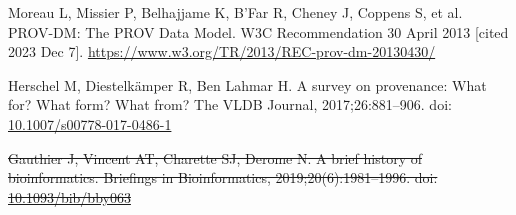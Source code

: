\documentclass[10pt,letterpaper]{article}
\providecommand{\DIFdeltex}[1]{{\protect\color{red}\sout{#1}}}                      %
\providecommand{\DIFdelbegin}{} %
\providecommand{\DIFdel}[1]{\texorpdfstring{\DIFdeltex{#1}}{}} %
\newcommand{\DIFscaledelfig}{0.5}
\newlength{\DIFdelgraphicswidth} %
\newlength{\DIFdelgraphicsheight} %
\newcommand{\DIFdelincludegraphics}[2][]{%
\sbox{\DIFdelgraphicsbox}{\DIFOincludegraphics[#1]{#2}}%
\settoboxwidth{\DIFdelgraphicswidth}{\DIFdelgraphicsbox} %
\settoboxtotalheight{\DIFdelgraphicsheight}{\DIFdelgraphicsbox} %
\scalebox{\DIFscaledelfig}{%
\parbox[b]{\DIFdelgraphicswidth}{\usebox{\DIFdelgraphicsbox}\\[-\baselineskip] \rule{\DIFdelgraphicswidth}{0em}}\llap{\resizebox{\DIFdelgraphicswidth}{\DIFdelgraphicsheight}{%
\setlength{\unitlength}{\DIFdelgraphicswidth}%
\begin{picture}(1,1)%
\thicklines\linethickness{2pt} %
{\color[rgb]{1,0,0}\put(0,0){\framebox(1,1){}}}%
{\color[rgb]{1,0,0}\put(0,0){\line( 1,1){1}}}%
{\color[rgb]{1,0,0}\put(0,1){\line(1,-1){1}}}%
\end{picture}%
}\hspace*{3pt}}} %
} %
\DeclareRobustCommand{\DIFdelbegin}{\DIFOdelbegin \let\includegraphics\DIFdelincludegraphics} %
\begin{document}
%
%
% 
\begin{thebibliography}{10}

\setlength{\parskip}{6pt}
\setlength{\itemsep}{0pt plus 0.3ex}


\begin{small}










Moreau L, Missier P, Belhajjame K, B'Far R, Cheney J, Coppens S, et al.
PROV-DM: The PROV Data Model. W3C Recommendation 30 April 2013 [cited 2023 Dec 7].
\url{https://www.w3.org/TR/2013/REC-prov-dm-20130430/}

Herschel M, Diestelkämper R, Ben Lahmar H.
A survey on provenance: What for? What form? What from?
The VLDB Journal, 2017;26:881--906.
doi: \href{https://doi.org/10.1007/s00778-017-0486-1}{10.1007/s00778-017-0486-1}

\DIFdelbegin {}
\DIFdel{Gauthier J, Vincent AT, Charette SJ, Derome N.
A brief history of bioinformatics.
Briefings in Bioinformatics, 2019;20(6):1981--1996.
doi: }\href{https://doi.org/10.1093/bib/bby063}{\DIFdel{10.1093/bib/bby063}}


\end{small}
\end{thebibliography}
\end{document}
